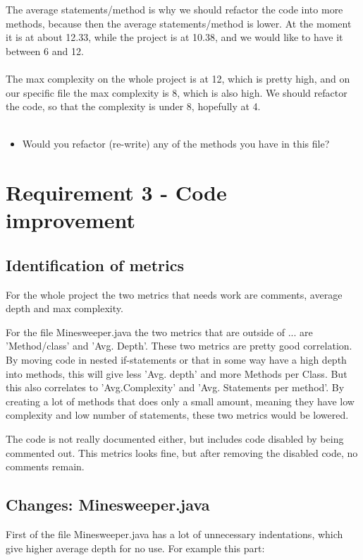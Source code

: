 \documentclass[UKenglish]{article}  %
\begin{document}
The average statements/method is why we should refactor the code into more methods, because then the average statements/method is lower. At the moment it is at about 12.33, while the project is at 10.38, and we would like to have it between 6 and 12. \\\\
The max complexity on the whole project is at 12, which is pretty high, and on our specific file the max complexity is 8, which is also high. We should refactor the code, so that the complexity is under 8, hopefully at 4. \\\\

\begin{itemize}
\item Would you refactor (re-write) any of the methods you have in this file?
\end{itemize}

\section{Requirement 3 - Code improvement}
\subsection{Identification of metrics}
For the whole project the two metrics that needs work are comments, average
depth and max complexity. 

For the file Minesweeper.java the two metrics that are outside of ... are 
'Method/class' and 'Avg. Depth'. These two metrics are pretty good correlation.
By moving code in nested if-statements or that in some way have a high depth 
into methods, this will give less 'Avg. depth' and more Methods per Class. 
But this also correlates to 'Avg.Complexity' and 'Avg. Statements per method'.
By creating a lot of methods that does only a small amount, meaning they have
low complexity and low number of statements, these two metrics would be lowered.

The code is not really documented either, but includes code disabled by being
commented out. This metrics looks fine, but after removing the disabled code,
no comments remain.

\subsection{Changes: Minesweeper.java}
First of the file Minesweeper.java has a lot of unnecessary indentations, which
give higher average depth for no use. For example this part:
\end{document}
